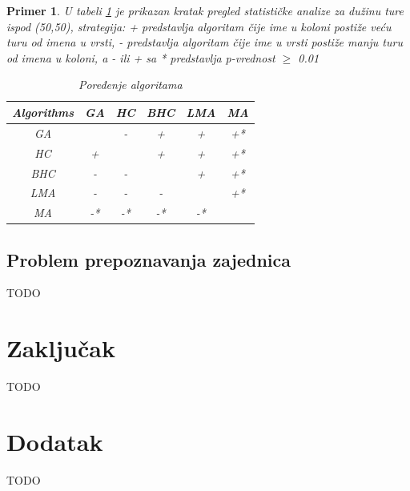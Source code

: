 \documentclass[a4paper]{article}
\newtheorem{primer}{Primer}[section]
\begin{document}
\begin{primer}U tabeli \ref{tab:tabela2} je prikazan kratak pregled statističke analize za dužinu ture ispod (50,50), strategija: + predstavlja algoritam čije ime u koloni postiže veću turu od imena u vrsti, - predstavlja algoritam čije ime u vrsti postiže manju turu od imena u koloni, a - ili + sa * predstavlja p-vrednost $\geq$ 0.01


\begin{table}[h!]
\begin{center}
\caption{Poređenje algoritama}
\begin{tabular}{||c|c|c|c|c|c||} \hline
Algorithms & GA& HC& BHC& LMA& MA\\ \hline
GA &  & - & + & + & +* \\ \hline
HC & + &  & + & + & +* \\ \hline
BHC & - & - &  & + & +* \\ \hline
LMA & - & - & - &  & +* \\ \hline
MA & -* & -* & -* & -* & \\ \hline
\end{tabular}
\label{tab:tabela2}
\end{center}
\end{table}

\end{primer}
















\subsection{Problem prepoznavanja zajednica}
\label{sec:prepoznavanje_zajednica}

TODO












\section{Zaključak}
\label{sec:zakljucak}

TODO

\appendix
 


\appendix
\section{Dodatak}
TODO
\end{document}
